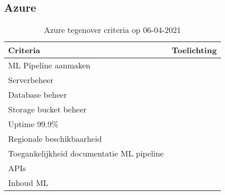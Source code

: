 \subsection*{Azure}\label{appendix:detailed-overview-of-cloud-computing-platforms:azure}
\begin{table}[hbt!]
  \centering
  \begin{tabular}{|p{.2\linewidth}|p{.74\linewidth}|}
  \hline
  \textbf{Criteria} & \textbf{Toelichting} \\ \hline
    ML Pipeline \newline aanmaken
    &

    \\ \hline

    Serverbeheer
    &

    \\ \hline

    Database beheer
    &

    \\ \hline

    Storage \newline bucket beheer
    &

    \\ \hline

    Uptime 99.9\%
    &

    \\ \hline

    Regionale \newline beschikbaarheid
    &

    \\ \hline

    Toegankelijkheid documentatie ML pipeline
    &

    \\ \hline

    APIs
    &

    \\ \hline

    Inhoud ML
    &

    \\ \hline
  \end{tabular}
  \caption{Azure tegenover criteria op 06-04-2021}
  \label{table:azure-against-criteria}
\end{table}

\newpage

